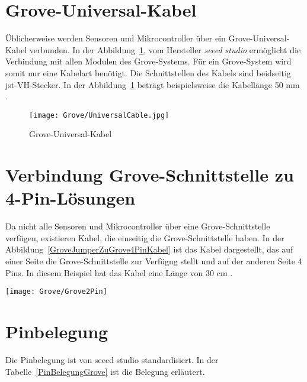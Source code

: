 \section{Grove-Universal-Kabel}

Üblicherweise werden Sensoren und Mikrocontroller über ein Grove-Universal-Kabel verbunden. In der Abbildung~\ref{GroveUniversalCable}, vom Hersteller \textit{seeed studio} ermöglicht die Verbindung mit allen Modulen des Grove-Systems. Für ein Grove-System wird somit nur eine Kabelart benötigt. Die Schnittstellen des Kabels sind beidseitig \ac{jst}-VH-Stecker. In der Abbildung~\ref{GroveUniversalCable} beträgt beispielsweise die Kabellänge  50 mm \cite{Seeed:2016}. 

\begin{figure}[h]
    \begin{center}
        \texttt{[image: Grove/UniversalCable.jpg]}
        \caption{Grove-Universal-Kabel\cite{Reichelt:2024b}}
        \label{GroveUniversalCable}
    \end{center}
\end{figure}

\section{Verbindung Grove-Schnittstelle zu 4-Pin-Lösungen}

Da nicht alle Sensoren und Mikrocontroller über eine Grove-Schnittstelle verfügen, existieren Kabel, die einseitig die Grove-Schnittstelle haben. In der Abbildung~\ref{GroveJumperZuGrove4PinKabel} ist das Kabel dargestellt, das auf einer Seite die Grove-Schnittstelle zur Verfügng stellt und auf der anderen Seite 4 Pins. In diesem Beispiel hat das Kabel  eine Länge von 30 cm \cite{Reichelt:2024g}.

    \begin{center}
        \texttt{[image: Grove/Grove2Pin]}
        \label{GroveJumperZuGrove4PinKabel}
    \end{center}


\section{Pinbelegung}

Die Pinbelegung ist von seeed studio standardisiert. In der Tabelle~\ref{PinBelegungGrove} ist die Belegung erläutert. \cite{Seeed:2016}

